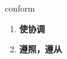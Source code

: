 
\begin{frame}
{\huge conform}
\begin{center}
\begin{enumerate}\Large
  \item \textbf{使协调}
  \item \textbf{遵照，遵从}
\end{enumerate}
\end{center}
\end{frame}
